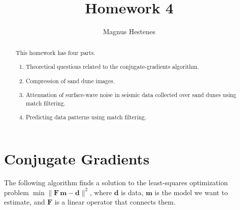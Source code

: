 \author{Magnus Hestenes}
\title{Homework 4}

\begin{abstract}
  This homework has four parts. 
  \begin{enumerate}
  \item Theoretical questions related to the conjugate-gradients algorithm.
  \item Compression of sand dune images.
  \item Attenuation of surface-wave noise in 
    seismic data collected over sand dunes using match filtering.
  \item Predicting data patterns using match filtering.
  \end{enumerate}
\end{abstract}

\section{Conjugate Gradients}
The following algorithm finds a solution to
  the least-squares optimization problem $\min
  \|\mathbf{F}\,\mathbf{m} - \mathbf{d}\|^2$, where $\mathbf{d}$ is
  data, $\mathbf{m}$ is the model we want to estimate, and
  $\mathbf{F}$ is a linear operator that connects them.

